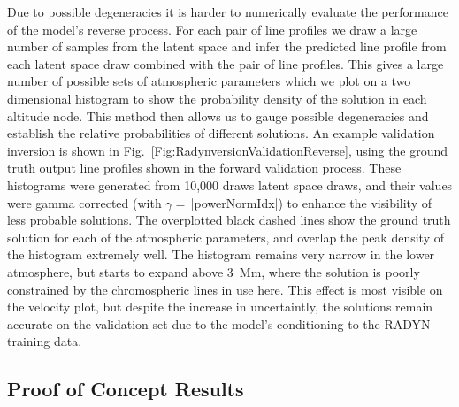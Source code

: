 Due to possible degeneracies it is harder to numerically evaluate the performance of the model's reverse process.
For each pair of line profiles we draw a large number of samples from the latent space and infer the predicted line profile from each latent space draw combined with the pair of line profiles.
This gives a large number of possible sets of atmospheric parameters which we plot on a two dimensional histogram to show the probability density of the solution in each altitude node.
This method then allows us to gauge possible degeneracies and establish the relative probabilities of different solutions.
An example validation inversion is shown in Fig.~\ref{Fig:RadynversionValidationReverse}, using the ground truth output line profiles shown in the forward validation process.
These histograms were generated from 10,000 draws latent space draws, and their values were gamma corrected (with $\gamma=\,$\py[Radynversion]|powerNormIdx|) to enhance the visibility of less probable solutions.
The overplotted black dashed lines show the ground truth solution for each of the atmospheric parameters, and overlap the peak density of the histogram extremely well.
The histogram remains very narrow in the lower atmosphere, but starts to expand above \SI{3}{\mega\metre}, where the solution is poorly constrained by the chromospheric lines in use here.
This effect is most visible on the velocity plot, but despite the increase in uncertaintly, the solutions remain accurate on the validation set due to the model's conditioning to the RADYN training data.

\subsection{Proof of Concept Results}

